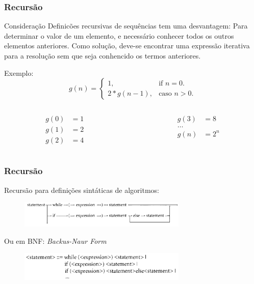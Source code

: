 \documentclass[10pt]{beamer}
\begin{document}
\begin{frame}
  \frametitle{Recursão}
  \begin{block}{Consideração}
    Definicões recursivas de sequências tem uma desvantagem: Para determinar o valor de um elemento, e necessário conhecer todos os outros elementos anteriores. Como solução, deve-se encontrar uma expressão iterativa para a resolução sem que seja conhencido os termos anteriores.
  \end{block}
  Exemplo:
  \begin{equation}
    g(n)=\begin{cases}
      1,        & \text{if $n=0$}.     \\
      2*g(n-1), & \text{caso $n > 0$}.
    \end{cases}
  \end{equation}
  \begin{columns}[t]
    \begin{column}{4cm}
      \begin{align*}
        g(0) & = 1 \\
        g(1) & = 2 \\
        g(2) & = 4
      \end{align*}
    \end{column}
    \begin{column}{4cm}
      \begin{align*}
        g(3)   & = 8   \\
        \ldots &       \\
        g(n)   & = 2^n
      \end{align*}
    \end{column}
  \end{columns}
  \vfill
\end{frame}

\begin{frame}
  \frametitle{Recursão}
  Recursão para definições sintáticas de algoritmos:
  \vfill
  \begin{figure}[h]
    \begin{center}
      \includegraphics[width=8cm]{fig/img03}
    \end{center}
  \end{figure}
  \vfill
  Ou em BNF: \emph{Backus-Naur Form}
  \vfill
  \begin{figure}[h]
    \begin{center}
      \includegraphics[width=8cm]{fig/img04}
    \end{center}
  \end{figure}

\end{frame}
\end{document}
